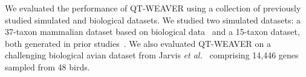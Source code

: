 \documentclass[runningheads]{llncs}
\begin{document}
We evaluated the performance of QT-WEAVER using a collection of previously studied simulated and biological datasets. We studied two simulated datasets: a 37-taxon mammalian dataset based on biological data~\cite{song-mammal} and a 15-taxon dataset, both generated in prior studies~\cite{statistical-binning,bayzid2015weighted}. 
We also evaluated QT-WEAVER on a challenging biological avian dataset from Jarvis \textit{et al.}~\cite{jarvis2014} comprising 14,446 genes sampled from 48 birds.


\end{document}
